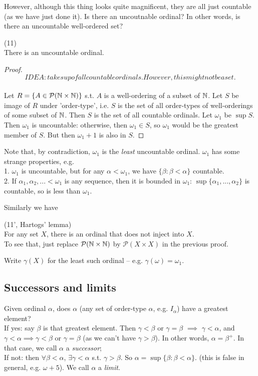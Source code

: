 \documentclass[a4paper]{article}
\begin{document}
However, although this thing looks quite magnificent, they are all just countable (as we have just done it). Is there an uncoutnable ordinal? In other words, is there an uncountable well-ordered set?

\begin{thm} (11)\\
There is an uncountable ordinal.
\begin{proof}
\[IDEA: take sup of all countable ordinals. However, this might not be a set.\]\\
Let $R=\{A \in \mathcal{P}(\mathbb{N} \times \mathbb{N})\}$ s.t. $A$ is a well-ordering of a subset of $\mathbb{N}$. Let $S$ be image of $R$ under 'order-type', i.e. $S$ is the set of all order-types of well-orderings of some subset of $\mathbb{N}$. Then $S$ is the set of all countable ordinals. Let $\omega_1$ be $\sup S$. Then $\omega_1$ is uncountable: otherwise, then $\omega_1 \in S$, so $\omega_1$ would be the greatest member of $S$. But then $\omega_1+1$ is also in $S$.
\end{proof}
\end{thm}

Note that, by contradiction, $\omega_1$ is the \emph{least} uncountable ordinal. $\omega_1$ has some strange properties, e.g.\\
1. $\omega_1$ is uncountable, but for any $\alpha < \omega_1$, we have $\{\beta:\beta < \alpha\}$ countable.\\
2. If $\alpha_1,\alpha_2,... < \omega_1$ is any sequence, then it is bounded in $\omega_1$: $\sup\{\alpha_1,...,\alpha_2\}$ is countable, so is less than $\omega_1$.

Similarly we have

\begin{thm} (11', Hartogs' lemma)\\
For any set $X$, there is an ordinal that  does not inject into $X$.\\
To see that, just replace $\mathcal{P}(\mathbb{N}\times\mathbb{N})$ by $\mathcal{P}(X \times X)$ in the previous proof.\\
\end{thm}

Write $\gamma(X)$ for the least such ordinal -- e.g. $\gamma(\omega) = \omega_1$.

\newpage

\subsection{Successors and limits}
Given ordinal $\alpha$, does $\alpha$ (any set of order-type $\alpha$, e.g. $I_\alpha$) have a greatest element?\\
If yes: say $\beta$ is that greatest element. Then $\gamma<\beta$ or $\gamma =\beta$ $\implies$ $\gamma<\alpha$, and $\gamma<\alpha \implies \gamma < \beta$ or $\gamma = \beta$ (as we can't have $\gamma > \beta$). In other words, $\alpha = \beta^+$. In that case, we call $\alpha$ a \emph{successor};\\
If not: then $\forall \beta < \alpha$, $\exists \gamma < \alpha$ s.t. $\gamma > \beta$. So $\alpha = \sup\{\beta:\beta < \alpha\}$. (this is false in general, e.g. $\omega+5$). We call $\alpha$ a \emph{limit}.
\end{document}
